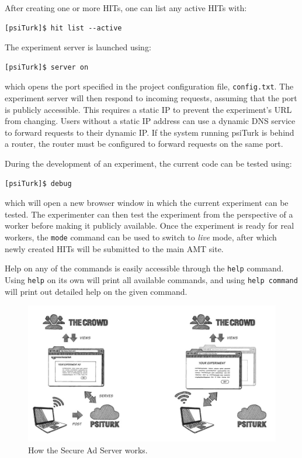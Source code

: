 \documentclass[twocolumn]{svjour3}          %
\newcommand{\psiturk}[0]{\textsf{psiTurk}}
\begin{document}
After creating one or more HITs, one can list any active HITs with:

\begin{lstlisting}
[psiTurk]$ hit list --active
\end{lstlisting}

The experiment server is launched using:

\begin{lstlisting}
[psiTurk]$ server on
\end{lstlisting}

\noindent which opens the port specified in the project configuration file, \texttt{config.txt}.
The experiment server will then respond to incoming requests, assuming that the port is publicly accessible.
This requires a static IP to prevent the experiment's URL from changing.
Users without a static IP address can use a dynamic DNS service to forward requests to their dynamic IP.
If the system running \psiturk{} is behind a router, the router must be configured to forward requests on the same port.

During the development of an experiment, the current code can be tested using:

\begin{lstlisting}
[psiTurk]$ debug
\end{lstlisting}

\noindent which will open a new browser window in which the current experiment can be tested. The experimenter can then test the experiment from the perspective of a worker before making it publicly available.
Once the experiment is ready for real workers, the \texttt{mode} command can be used to switch to \emph{live} mode, after which newly created HITs will be submitted to the main AMT site.

Help on any of the commands is easily accessible through the \texttt{help} command. Using \texttt{help} on its own will print all available commands, and using \texttt{help command} will print out detailed help on the given command.

\begin{figure}[tp]
\centering
\includegraphics[scale=.40]{figures/psiturk_cloud_sequence.jpg}
\caption{How the Secure Ad Server works.}
\label{fig:adserver}
\end{figure}
\end{document}
